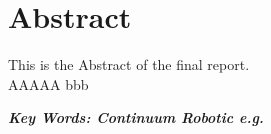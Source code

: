 \section*{Abstract} 
This is the Abstract of the final report. \\
AAAAA
bbb

\vfill


\textbf{\emph{Key Words: Continuum Robotic e.g.}}
\vspace{0.8cm}
\setcounter{page}{1}
\newpage